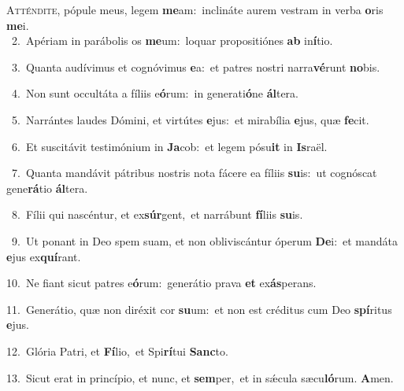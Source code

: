 \lettrine{\initial\textcolor{\initialcolor}{A}}{tténdite,} pópule meus, legem \textbf{me}\-am:~\star inclináte aurem vestram in verba \textbf{o}\-ris \textbf{me}\-i.\\
{\numbfont\textcolor{\numbcolor}{~2.}}~Apériam in parábolis os \textbf{me}\-um:~\star loquar propositiónes \textbf{ab} in\-\textbf{í}\-tio.\par
{\numbfont\textcolor{\numbcolor}{~3.}}~Quanta audívimus et cognóvimus \textbf{e}\-a:~\star et patres nostri narra\-\textbf{vé}\-runt \textbf{no}\-bis.\par
{\numbfont\textcolor{\numbcolor}{~4.}}~Non sunt occultáta a fíliis e\-\textbf{ó}\-rum:~\star in generati\-\textbf{ó}\-ne \textbf{ál}\-tera.\par
{\numbfont\textcolor{\numbcolor}{~5.}}~Narrántes laudes Dómini, et virtútes \textbf{e}\-jus:~\star et mirabília \textbf{e}\-jus, quæ \textbf{fe}\-cit.\par
{\numbfont\textcolor{\numbcolor}{~6.}}~Et suscitávit testimónium in \textbf{Ja}\-cob:~\star et legem pósu\textbf{it} in \textbf{Is}\-raël.\par
{\numbfont\textcolor{\numbcolor}{~7.}}~Quanta mandávit pátribus nostris nota fácere ea fíliis \textbf{su}\-is:~\star ut cognóscat gene\-\textbf{rá}\-tio \textbf{ál}\-tera.\par
{\numbfont\textcolor{\numbcolor}{~8.}}~Fílii qui nascéntur, et ex\-\textbf{súr}\-gent,~\star et narrábunt \textbf{fí}\-liis \textbf{su}\-is.\par
{\numbfont\textcolor{\numbcolor}{~9.}}~Ut ponant in Deo spem suam, et non obliviscántur óperum \textbf{De}\-i:~\star et mandáta \textbf{e}\-jus ex\-\textbf{quí}\-rant.\par
{\numbfont\textcolor{\numbcolor}{10.}}~Ne fiant sicut patres e\-\textbf{ó}\-rum:~\star generátio prava \textbf{et} ex\-\textbf{ás}\-perans.\par
{\numbfont\textcolor{\numbcolor}{11.}}~Generátio, quæ non diréxit cor \textbf{su}\-um:~\star et non est créditus cum Deo \textbf{spí}\-ritus \textbf{e}\-jus.\par
{\numbfont\textcolor{\numbcolor}{12.}}~Glória Patri, et \textbf{Fí}\-lio,~\star et Spi\-\textbf{rí}\-tui \textbf{Sanc}\-to.\par
{\numbfont\textcolor{\numbcolor}{13.}}~Sicut erat in princípio, et nunc, et \textbf{sem}\-per,~\star et in sǽcula sæcu\-\textbf{ló}\-rum. \textbf{A}\-men.\par
